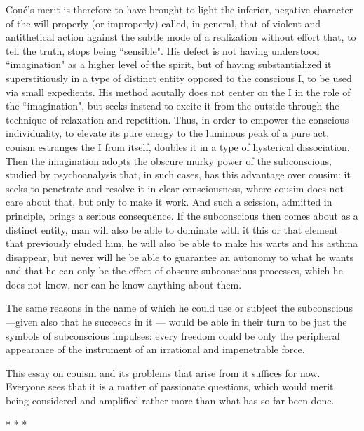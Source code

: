 Coué's merit is therefore to have brought to light the inferior, negative character of the will properly (or improperly) called, in general, that of violent and antithetical action against the subtle mode of a realization without effort that, to tell the truth, stops being ``sensible". His defect is not having understood ``imagination" as a higher level of the spirit, but of having substantialized it superstitiously in a type of distinct entity opposed to the conscious I, to be used via small expedients. His method acutally does not center on the I in the role of the ``imagination", but seeks instead to excite it from the outside through the technique of relaxation and repetition. Thus, in order to empower the conscious individuality, to elevate its pure energy to the luminous peak of a pure act, couism estranges the I from itself, doubles it in a type of hysterical dissociation. Then the imagination adopts the obscure murky power of the subconscious, studied by psychoanalysis that, in such cases, has this advantage over cousim: it seeks to penetrate and resolve it in clear consciousness, where cousim does not care about that, but only to make it work. And such a scission, admitted in principle, brings a serious consequence. If the subconscious then comes about as a distinct entity, man will also be able to dominate with it this or that element that previously eluded him, he will also be able to make his warts and his asthma disappear, but never will he be able to guarantee an autonomy to what he wants and that he can only be the effect of obscure subconscious processes, which he does not know, nor can he know anything about them.

The same reasons in the name of which he could use or subject the subconscious—given also that he succeeds in it — would be able in their turn to be just the symbols of subconscious impulses: every freedom could be only the peripheral appearance of the instrument of an irrational and impenetrable force.

This essay on couism and its problems that arise from it suffices for now. Everyone sees that it is a matter of passionate questions, which would merit being considered and amplified rather more than what has so far been done.

\hfill


\begin{center}* * *\end{center}

